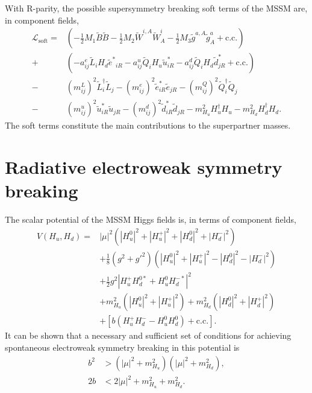 \documentclass[twoside,english]{uiofysmaster}
\begin{document}
With R-parity, the possible supersymmetry breaking soft terms of the MSSM are, in component fields,
\begin{align}
  \mathcal{L}_\mathrm{soft} = &\left( -\frac{1}{2}M_1 \tilde B \tilde B - \frac{1}{2}M_2 \tilde W^{i,A} \tilde W^i_A - \frac{1}{2}M_3 \tilde g^{a,A}\tilde g^a_A + \mathrm{c.c.} \right)\nonumber\\
  + &\left(-a_{ij}^e \tilde L_i H_d {\tilde e^*}_{iR} - a_{ij}^u \tilde Q_i H_u \tilde u^*_{iR} - a_{ij}^d \tilde Q_i H_d \tilde d^*_{jR} + \mathrm{c.c.} \right)\\
  - &(m_{ij}^L)^2 \tilde L_i^\dag \tilde L_j - (m_{ij}^e)^2 {\tilde e_{iR}^*} {\tilde e_{jR}} - (m_{ij}^Q)^2 \tilde Q_i^\dag \tilde Q_j \nonumber \\
  - &(m_{ij}^u)^2 {\tilde u_{iR}^*} {\tilde u_{jR}} - (m_{ij}^d)^2 {\tilde d_{iR}^*} {\tilde d_{jR}} - m^2_{H_u} H^\dag_u H_u - m^2_{H_d} H^\dag_d H_d.\nonumber
\end{align}
The soft terms constitute the main contributions to the superpartner masses. 

\section{Radiative electroweak symmetry breaking}
\label{sec:REWSB}
The scalar potential of the MSSM Higgs fields is, in terms of component fields,
\begin{align}
	V(H_u, H_d) = 	&|\mu|^2 \left( |H_u^0|^2 + |H_u^+|^2 + |H_d^0|^2 + |H_d^-|^2 \right)\nonumber \\
					&+ \frac{1}{8} \left( g^2 + g'^2 \right) \left( |H_u^0|^2 + |H_u^+|^2 - |H_d^0|^2 - |H_d^-|^2 \right)\nonumber \\
					&+ \frac{1}{2} g^2 |H_u^+ H_d^{0*} + H_u^0 H_d^{-*}|^2\label{eq:mssm_higgspotential}\\
					&+ m_{H_u}^2 \left( |H_u^0|^2 + |H_u^+|^2 \right) + m_{H_d}^2 \left( |H_d^0|^2 + |H_d^+|^2 \right)\nonumber \\
					&+ \left[b\left(H_u^+ H_d^- - H_u^0 H_d^0\right) + \mathrm{c.c.}\right].\nonumber
\end{align}
It can be shown that a necessary and sufficient set of conditions for achieving spontaneous electroweak symmetry breaking in this potential is \cite{Martin:1997ns}
\begin{align}
	b^2 &> \left( |\mu|^2 + m_{H_u}^2 \right) \left( |\mu|^2 + m_{H_d}^2 \right),\label{eq:rewsb-cond1}\\
	2b &< 2|\mu|^2 + m_{H_u}^2 + m_{H_d}^2.\label{eq:rewsb-cond2}
\end{align}
\end{document}
